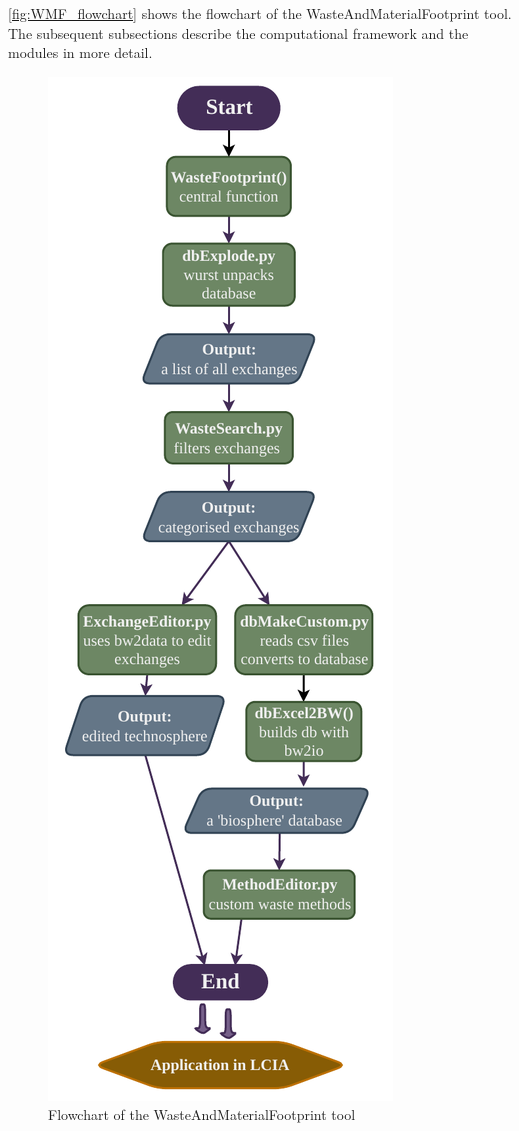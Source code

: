 \autoref{fig:WMF_flowchart} shows the flowchart of the WasteAndMaterialFootprint tool. The subsequent subsections describe the computational framework and the modules in more detail.

\begin{figure}[h!]
    \centering
    \includegraphics[width=0.7\columnwidth]{figures/WMF_flowchart.pdf}
    \caption{Flowchart of the WasteAndMaterialFootprint tool }\label{fig:WMF_flowchart}
\end{figure}

